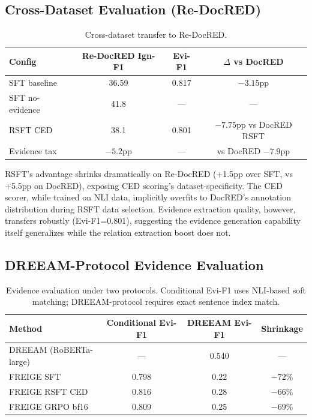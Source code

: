 \documentclass[11pt]{article}
\begin{document}
\subsection{Cross-Dataset Evaluation (Re-DocRED)}

\begin{table}[h]
\centering
\caption{Cross-dataset transfer to Re-DocRED.}
\label{tab:redocred}
\begin{tabular}{lccc}
\toprule
\textbf{Config} & \textbf{Re-DocRED Ign-F1} & \textbf{Evi-F1} & \textbf{$\Delta$ vs DocRED} \\
\midrule
SFT baseline & 36.59 & 0.817 & $-3.15$pp \\
SFT no-evidence & 41.8 & --- & --- \\
RSFT CED & 38.1 & 0.801 & $-7.75$pp vs DocRED RSFT \\
Evidence tax & $-5.2$pp & --- & vs DocRED $-7.9$pp \\
\bottomrule
\end{tabular}
\end{table}

RSFT's advantage shrinks dramatically on Re-DocRED (+1.5pp over SFT, vs +5.5pp on DocRED), exposing CED scoring's dataset-specificity. The CED scorer, while trained on NLI data, implicitly overfits to DocRED's annotation distribution during RSFT data selection. Evidence extraction quality, however, transfers robustly (Evi-F1=0.801), suggesting the evidence generation capability itself generalizes while the relation extraction boost does not.

\subsection{DREEAM-Protocol Evidence Evaluation}

\begin{table}[h]
\centering
\caption{Evidence evaluation under two protocols. Conditional Evi-F1 uses NLI-based soft matching; DREEAM-protocol requires exact sentence index match.}
\label{tab:dreeam}
\begin{tabular}{lccc}
\toprule
\textbf{Method} & \textbf{Conditional Evi-F1} & \textbf{DREEAM Evi-F1} & \textbf{Shrinkage} \\
\midrule
DREEAM (RoBERTa-large) & --- & 0.540 & --- \\
FREIGE SFT & 0.798 & 0.22 & $-72\%$ \\
FREIGE RSFT CED & 0.816 & 0.28 & $-66\%$ \\
FREIGE GRPO bf16 & 0.809 & 0.25 & $-69\%$ \\
\bottomrule
\end{tabular}
\end{table}
\end{document}
